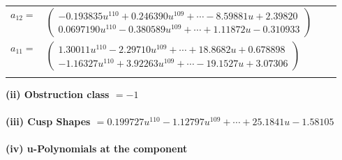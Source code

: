 \documentclass[1p]{elsarticle_modified}
\theoremstyle{definition}
\begin{document}
\begin{tabular}{m{7pt} m{180pt} m{7pt} m{180pt} }
\flushright $a_{12}=$&$\begin{pmatrix}-0.193835 u^{110}+0.246390 u^{109}+\cdots-8.59881 u+2.39820\\0.0697190 u^{110}-0.380589 u^{109}+\cdots+1.11872 u-0.310933\end{pmatrix}$ \\
\flushright $a_{11}=$&$\begin{pmatrix}1.30011 u^{110}-2.29710 u^{109}+\cdots+18.8682 u+0.678898\\-1.16327 u^{110}+3.92263 u^{109}+\cdots-19.1527 u+3.07306\end{pmatrix}$\\&\end{tabular}
\flushleft \textbf{(ii) Obstruction class $= -1$}\\~\\
\flushleft \textbf{(iii) Cusp Shapes $= 0.199727 u^{110}-1.12797 u^{109}+\cdots+25.1841 u-1.58105$}\\~\\
\newpage\renewcommand{\arraystretch}{1}
\flushleft \textbf{(iv) u-Polynomials at the component}\newline \\
\end{document}
